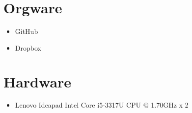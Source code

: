 \documentclass[a4paper]{scrreprt}
\begin{document}
    \section{Orgware}
        \begin{itemize}
        	\item GitHub
        	\item Dropbox
        \end{itemize}
        
    \section{Hardware}
        \begin{itemize}
        	\item Lenovo Ideapad Intel Core i5-3317U CPU @ 1.70GHz x 2
        \end{itemize}
        
\printnoidxglossaries
\end{document}
